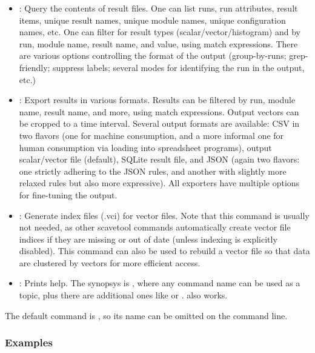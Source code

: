 \begin{itemize}

\item {}: Query the contents of result files. One can list
    runs, run attributes, result items, unique result names, unique module
    names, unique configuration names, etc. One can filter for result types
    (scalar/vector/histogram) and by run, module name, result name, and value,
    using match expressions. There are various options controlling the format
    of the output (group-by-runs; grep-friendly; suppress labels; several
    modes for identifying the run in the output, etc.)

\item {}: Export results in various formats. Results can be filtered
    by run, module name, result name, and more, using match expressions. Output
    vectors can be cropped to a time interval. Several output formats are
    available: CSV in two flavors (one for machine consumption, and a more
    informal one for human consumption via loading into spreadsheet programs),
    {\opp} output scalar/vector file (default), {\opp} SQLite result file, and
    JSON (again two flavors: one strictly adhering to the JSON rules, and
    another with slightly more relaxed rules but also more expressive). All
    exporters have multiple options for fine-tuning the output.

\item {}: Generate index files (.vci) for vector files. Note that this
    command is usually not needed, as other scavetool commands automatically create
    vector file indices if they are missing or out of date (unless indexing is
    explicitly disabled). This command can also be used to rebuild a vector file
    so that data are clustered by vectors for more efficient access.

\item {}: Prints help. The synopsys is ,
    where any command name can be used as a topic, plus there are
    additional ones like  or .  also works.

\end{itemize}

The default command is , so its name can be omitted on the
command line.


\subsubsection{Examples}
\label{sec:ana-sim:scavetool:examples}

